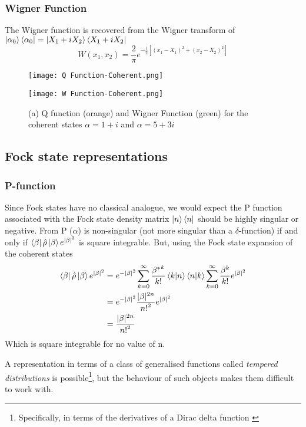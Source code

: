 \subsubsection{Wigner Function}
The Wigner function is recovered from the Wigner transform of $\ket{\alpha_0}\bra{\alpha_0} = \ket{X_1+iX_2}\bra{X_1+iX_2}$
\begin{equation}
	W(x_1, x_2) = \frac{2}{\pi} e^{-\frac{1}{2}[{(x_1-X_1)}^2+{(x_2-X_2)}^2]}
\end{equation}
\begin{figure}[!htb]
  \begin{minipage}{0.5\linewidth}
          \texttt{[image: Q Function-Coherent.png]}
	\end{minipage}%
  \begin{minipage}{0.5\linewidth}
          \texttt{[image: W Function-Coherent.png]}
    \end{minipage}
  \caption{(a) Q function (orange) and Wigner Function (green) for the coherent states $\alpha = 1+i$ and $\alpha = 5+3i$}
\end{figure}
\subsection{Fock state representations}
\subsubsection{P-function}
Since Fock states have no classical analogue, we would expect the P function associated with the Fock state density matrix $\ket{n}\bra{n}$ should be highly singular or negative.
From \cite{Mehta1967}  P ($\alpha$) is non-singular (not more singular than a $\delta$-function) if and only if $ \bra{\beta} \hat{\rho} \ket{\beta} e^{|\beta|^2} $ is square integrable.
But, using the Fock state expansion of the coherent states
\begin{align}
	 \bra{\beta} \hat{\rho} \ket{\beta} e^{|\beta|^2}  &= e^{-|\beta|^2} \sum_{k=0}^\infty \frac {{\beta^*}^k}{k!} \braket{k}{n}\braket{n}{k} \sum_{k=0}^\infty \frac {\beta^k}{k!}e^{|\beta|^2} \\ &= e^{-|\beta|^2} \frac{|\beta|^{2n}}{{n!}^2} e^{|\beta|^2} \\ &= \frac{|\beta|^{2n}}{{n!}^2}
\end{align}
Which is square integrable for no value of n.

A representation in terms of a class of generalised functions called \emph{tempered distributions} is possible\footnote{Specifically, in terms of the derivatives of a Dirac delta function \cite{Gerry2005}}, but the behaviour of such objects makes them difficult to work with.
